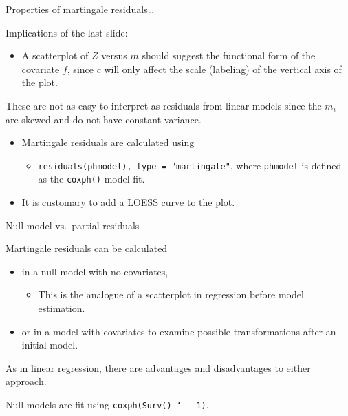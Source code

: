 \documentclass[ignorenonframetext,]{beamer}
\providecommand{\tightlist}{%
  \setlength{\itemsep}{0pt}\setlength{\parskip}{0pt}}
\begin{document}
\begin{frame}{%
\protect\hypertarget{properties-of-martingale-residuals-1}{%
Properties of martingale residuals\ldots}}

Implications of the last slide:

\begin{itemize}
\tightlist
\item
  A scatterplot of \(Z\) versus \(m\) should suggest the functional form
  of the covariate \(f\), since \(c\) will only affect the scale
  (labeling) of the vertical axis of the plot.
\end{itemize}

These are not as easy to interpret as residuals from linear models since
the \(m_i\) are skewed and do not have constant variance.

\begin{itemize}
\item
  Martingale residuals are calculated using

  \begin{itemize}
  \tightlist
  \item
    \texttt{residuals(phmodel), type = "martingale"}, where
    \texttt{phmodel} is defined as the \texttt{coxph()} model fit.
  \end{itemize}
\item
  It is customary to add a LOESS curve to the plot.
\end{itemize}

\end{frame}

\begin{frame}{%
\protect\hypertarget{null-model-vs.partial-residuals}{%
Null model vs.~partial residuals}}

Martingale residuals can be calculated

\begin{itemize}
\item
  in a null model with no covariates,

  \begin{itemize}
  \tightlist
  \item
    This is the analogue of a scatterplot in regression before model
    estimation.
  \end{itemize}
\item
  or in a model with covariates to examine possible transformations
  after an initial model.
\end{itemize}

As in linear regression, there are advantages and disadvantages to
either approach.

Null models are fit using \texttt{coxph(Surv() \char`~ \ 1)}.

\end{frame}
\end{document}
